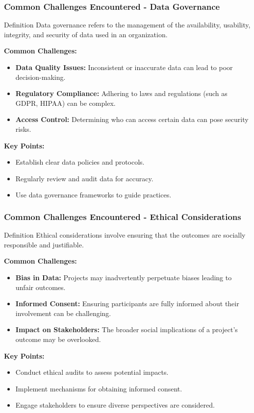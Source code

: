 \documentclass{beamer}
\begin{document}
\begin{frame}[fragile]
    \frametitle{Common Challenges Encountered - Data Governance}
    \begin{block}{Definition}
        Data governance refers to the management of the availability, usability, integrity, and security of data used in an organization.
    \end{block}

    \textbf{Common Challenges:}
    \begin{itemize}
        \item \textbf{Data Quality Issues:} Inconsistent or inaccurate data can lead to poor decision-making.
        \item \textbf{Regulatory Compliance:} Adhering to laws and regulations (such as GDPR, HIPAA) can be complex.
        \item \textbf{Access Control:} Determining who can access certain data can pose security risks.
    \end{itemize}
    
    \textbf{Key Points:}
    \begin{itemize}
        \item Establish clear data policies and protocols.
        \item Regularly review and audit data for accuracy.
        \item Use data governance frameworks to guide practices.
    \end{itemize}
\end{frame}

\begin{frame}[fragile]
    \frametitle{Common Challenges Encountered - Ethical Considerations}
    \begin{block}{Definition}
        Ethical considerations involve ensuring that the outcomes are socially responsible and justifiable.
    \end{block}

    \textbf{Common Challenges:}
    \begin{itemize}
        \item \textbf{Bias in Data:} Projects may inadvertently perpetuate biases leading to unfair outcomes.
        \item \textbf{Informed Consent:} Ensuring participants are fully informed about their involvement can be challenging.
        \item \textbf{Impact on Stakeholders:} The broader social implications of a project’s outcome may be overlooked.
    \end{itemize}
    
    \textbf{Key Points:}
    \begin{itemize}
        \item Conduct ethical audits to assess potential impacts.
        \item Implement mechanisms for obtaining informed consent.
        \item Engage stakeholders to ensure diverse perspectives are considered.
    \end{itemize}
\end{frame}
\end{document}
